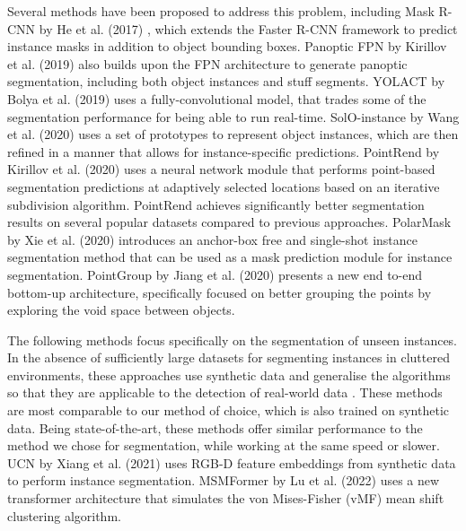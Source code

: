 \documentclass[10pt,twocolumn,letterpaper]{article}
\begin{document}
Several methods have been proposed to address this problem, including Mask R-CNN by He et al. (2017) \cite{He_Gkioxari_Dollar_Girshick_2018} \cite{Danielczuk_Matl_Gupta_Li_Lee_Mahler_Goldberg_2019}, which extends the Faster R-CNN framework to predict instance masks in addition to object bounding boxes. Panoptic FPN by Kirillov et al. (2019) \cite{Kirillov_Girshick_He_Dollar_2019} also builds upon the FPN architecture to generate panoptic segmentation, including both object instances and stuff segments. YOLACT by Bolya et al. (2019) \cite{Bolya_Zhou_Xiao_Lee_2019} uses a fully-convolutional model, that trades some of the segmentation performance for being able to run real-time. 
SolO-instance by Wang et al. (2020) \cite{Wang_Kong_Shen_Jiang_Li_2020} uses a set of prototypes to represent object instances, which are then refined in a manner that allows for instance-specific predictions. PointRend by Kirillov et al. (2020) \cite{Kirillov_Wu_He_Girshick_2020} uses a neural network module that performs point-based segmentation predictions at adaptively selected locations based on an iterative subdivision algorithm. PointRend achieves significantly better segmentation results on several popular datasets compared to previous approaches. PolarMask by Xie et al. (2020) \cite{Xie_Sun_Song_Wang_Liang_Shen_Luo_2020} introduces an anchor-box free and single-shot instance segmentation method that can be used as a mask prediction module for instance segmentation. PointGroup by Jiang et al. (2020) \cite{Jiang_Zhao_Shi_Liu_Fu_Jia_2020} presents a new end to-end bottom-up architecture, specifically focused on better grouping the points by exploring the void space between objects. 

The following methods focus specifically on the segmentation of unseen instances. In the absence of sufficiently large datasets for segmenting instances in cluttered environments, these approaches use synthetic data and generalise the algorithms so that they are applicable to the detection of real-world data \cite{Xie_Xiang_Mousavian_Fox_2020}. These methods are most comparable to our method of choice, which is also trained on synthetic data. Being state-of-the-art, these methods offer similar performance to the method we chose for segmentation, while working at the same speed or slower. UCN by Xiang et al. (2021) \cite{Xiang_Xie_Mousavian_Fox_2021} uses RGB-D feature embeddings from synthetic data to perform instance segmentation. MSMFormer by Lu et al. (2022) \cite{Lu_Chen_Ruozzi_Xiang_2022} uses a new transformer architecture that simulates the von Mises-Fisher (vMF) mean shift clustering algorithm.
\end{document}
